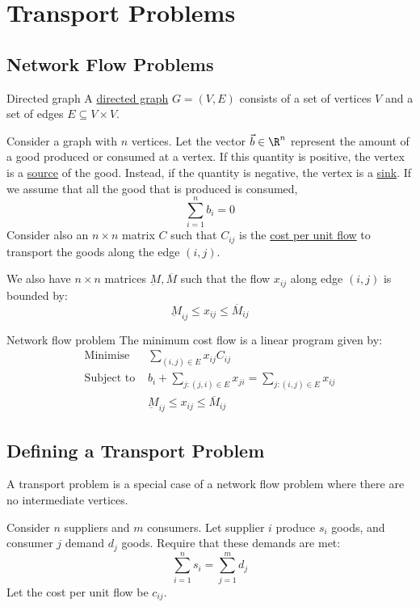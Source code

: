 \documentclass[../Main.tex]{subfiles}
\begin{document}
\section{Transport Problems}
\subsection{Network Flow Problems}
\begin{definition}{Directed graph}
    A \underline{directed graph} $G = (V, E)$ consists of a set of vertices $V$ and a set of edges $E \subseteq V \times V$.
\end{definition}
Consider a graph with $n$ vertices. Let the vector $\vec{b} \in \R^n$ represent the amount of a good produced or consumed at a vertex. If this quantity is positive, the vertex is a \underline{source} of the good. Instead, if the quantity is negative, the vertex is a \underline{sink}. If we assume that all the good that is produced is consumed,
\begin{equation*}
    \sum_{i = 1}^n b_i = 0
\end{equation*}
Consider also an $n \times n$ matrix $C$ such that $C_{ij}$ is the \underline{cost per unit flow} to transport the goods along the edge $(i, j)$.

We also have $n \times n$ matrices $\underbar{M}, \overline{M}$ such that the flow $x_{ij}$ along edge $(i, j)$ is bounded by:
\begin{equation*}
    \underbar{M}_{ij} \leq x_{ij} \leq \overline{M}_{ij}
\end{equation*}
\begin{definition}{Network flow problem}
    The minimum cost flow is a linear program given by:
    \begin{align*}
        \text{Minimise } &\sum_{(i, j) \in E} x_{ij} C_{ij} \\
        \text{Subject to } &b_i + \sum_{j : (j,i) \in E} x_{ji} = \sum_{j : (i, j) \in E} x_{ij} \\
        & \underbar{M}_{ij} \leq x_{ij} \leq \overline{M}_{ij}
    \end{align*}
\end{definition}
\subsection{Defining a Transport Problem}
A transport problem is a special case of a network flow problem where there are no intermediate vertices.

Consider $n$ suppliers and $m$ consumers. Let supplier $i$ produce $s_i$ goods, and consumer $j$ demand $d_j$ goods. Require that these demands are met:
\begin{equation*}
    \sum_{i = 1}^n s_i = \sum_{j = 1}^m d_j
\end{equation*}
Let the cost per unit flow be $c_{ij}$.
\end{document}
